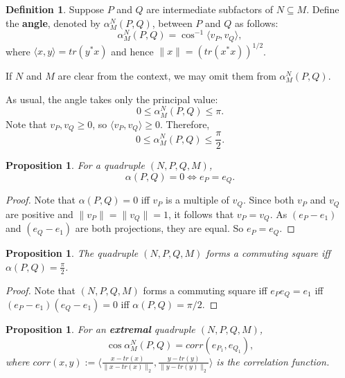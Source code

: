 \documentclass[11pt,letterpaper]{amsart}
\newtheorem{proposition}[theorem]{Proposition}
\theoremstyle{definition}
\newtheorem{definition}[theorem]{Definition}
\theoremstyle{remark}
\begin{document}
 
\begin{definition}\label{alpha}
Suppose $P$ and $Q$ are intermediate subfactors of $N\subseteq M$.
Define the \textbf{angle}, denoted by $\alpha^N_M(P,Q)$, between $P$ and $Q$ as follows:
 \begin{equation*}
 \alpha^N_M(P, Q) =  \cos^{-1} {\langle v_P,v_Q\rangle},
 \end{equation*}
 where ${\langle x, y\rangle}= tr(y^*x)$ and 
 hence  ${\lVert x\rVert}= (tr(x^*x))^{1/2}$.
 \end{definition}
If $N$ and $M$ are clear from the context, we may omit them from ${\alpha}^N_M(P,Q).$
 
As usual, the angle takes only the principal value:
$$\displaystyle 0 \leq \alpha^N_M(P,Q) \leq \pi.$$
Note that $v_P, v_Q \geq 0$, so $\langle v_P,v_Q\rangle \geq 0$.
Therefore,
$$\displaystyle 0 \leq \alpha^N_M(P,Q) \leq \frac{\pi}{2}.$$


 \begin{proposition}
 For a quadruple $(N,P,Q,M)$, 
 $$\alpha(P,Q) = 0  \iff  e_P = e_Q.$$
\end{proposition}

\begin{proof}
Note that $\alpha(P,Q)=0$ iff $v_P$ is a multiple of $v_Q$. Since both $v_P$ and $v_Q$ are positive and $\lVert v_P\rVert= \lVert v_Q \rVert=1$, it follows that $v_P=v_Q.$  As $(e_P-e_1)$ and $(e_Q-e_1)$ are both projections, they are equal. So $e_P=e_Q$.
\end{proof}

\begin{proposition}\label{commuting}
The quadruple $(N,P,Q,M)$ forms a commuting square iff $\alpha(P,Q)= \frac{\pi}{2}$.
\end{proposition}
\begin{proof}
Note that
  $(N,P,Q,M)$ forms a commuting  square  iff $e_P e_Q= e_1$ iff $(e_P-e_1)(e_Q-e_1)=0$ iff $\alpha(P,Q) = \pi/2.$
\end{proof}

 

\begin{proposition}\label{Prop: correlation}
For an \textbf{extremal} quadruple $(N,P,Q,M)$,  
\begin{equation*}
\cos \alpha^N_M(P, Q) = corr(e_{P_1},e_{Q_1}),
\end{equation*}
where $corr(x,y):=\langle \frac{x-tr(x)}{\|x-tr(x)\|_2}, \frac{y-tr(y)}{\|y-tr(y)\|_2} \rangle $ is the correlation function. 
\end{proposition}
\end{document}
